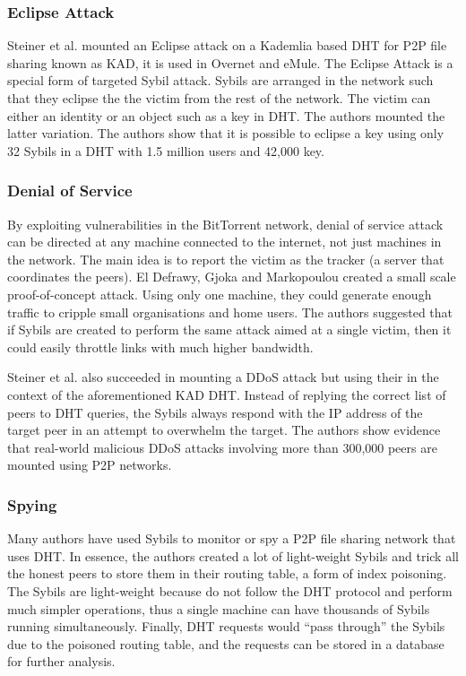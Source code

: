 \subsubsection{Eclipse Attack}
Steiner et al. mounted an Eclipse attack on a Kademlia based DHT for P2P file
sharing known as KAD, it is used in Overnet and
eMule\cite{steiner2007exploiting}. The Eclipse Attack\cite{singh2006eclipse} is
a special form of targeted Sybil attack. Sybils are arranged in the network such
that they eclipse the the victim from the rest of the network. The victim can
either an identity or an object such as a key in DHT. The authors mounted the
latter variation. The authors show that it is possible to eclipse a key using
only 32 Sybils in a DHT with 1.5 million users and 42,000 key.


\subsubsection{Denial of Service}
By exploiting vulnerabilities in the BitTorrent network, denial of service
attack can be directed at any machine connected to the internet, not just
machines in the network\cite{sia2006ddos}. The main idea is to report the victim
as the tracker (a server that coordinates the peers). El Defrawy, Gjoka and
Markopoulou created a small scale proof-of-concept attack. Using only one
machine, they could generate enough traffic to cripple small organisations and
home users. The authors suggested that if Sybils are created to perform the same
attack aimed at a single victim, then it could easily throttle links with much
higher bandwidth\cite{el2007bottorrent}.

Steiner et al. also succeeded in mounting a DDoS attack but using their in the
context of the aforementioned KAD DHT\cite{steiner2007exploiting}. Instead of
replying the correct list of peers to DHT queries, the Sybils always respond
with the IP address of the target peer in an attempt to overwhelm the target.
The authors show evidence that real-world malicious DDoS attacks involving more than
300,000 peers are mounted using P2P networks.

\subsubsection{Spying}
Many authors have used Sybils to monitor or spy a P2P file sharing network that
uses DHT\cite{holz2008measurements, steiner2007exploiting}. In essence, the
authors created a lot of light-weight Sybils and trick all the honest peers to
store them in their routing table, a form of index poisoning. The Sybils are
light-weight because do not follow the DHT protocol and perform much simpler
operations, thus a single machine can have thousands of Sybils running
simultaneously. Finally, DHT requests would ``pass through'' the Sybils due to
the poisoned routing table, and the requests can be stored in a database for
further analysis. 

